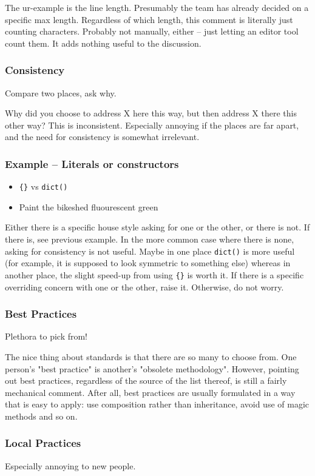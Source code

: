 The ur-example is the line length.
Presumably the team has already decided on a specific max length.
Regardless of which length,
this comment is literally just counting characters.
Probably not manually, either --
just letting an editor tool count them.
It adds nothing useful to the discussion.

\begin{frame}
\frametitle{Consistency}
Compare two places,
ask why.
\end{frame}

Why did you choose to address X here this way,
but then address X there this other way?
This is inconsistent.
Especially annoying if the places are far apart,
and the need for consistency is somewhat irrelevant.

\begin{frame}[fragile]
\frametitle{Example -- Literals or constructors}
\begin{itemize}
\item \verb|{}| vs \verb|dict()|
\item Paint the bikeshed fluourescent green
\end{itemize}
\end{frame}

Either there is a specific house style asking for one or the other,
or there is not.
If there is, see previous example.
In the more common case where there is none,
asking for consistency is not useful.
Maybe in one place \verb|dict()| is more useful
(for example, it is supposed to look symmetric to something else)
whereas in another place,
the slight speed-up from using \verb|{}| is worth it.
If there is a specific overriding concern with one or the other,
raise it.
Otherwise, do not worry.

\begin{frame}
\frametitle{Best Practices}
Plethora to pick from!
\end{frame}

The nice thing about standards is that there are so many to choose from.
One person's "best practice"
is another's "obsolete methodology".
However,
pointing out best practices,
regardless of the source of the list thereof,
is still a fairly mechanical comment.
After all,
best practices are usually formulated in a way that is easy to apply:
use composition rather than inheritance,
avoid use of magic methods
and so on.

\begin{frame}
\frametitle{Local Practices}
Especially annoying to new people.
\end{frame}

